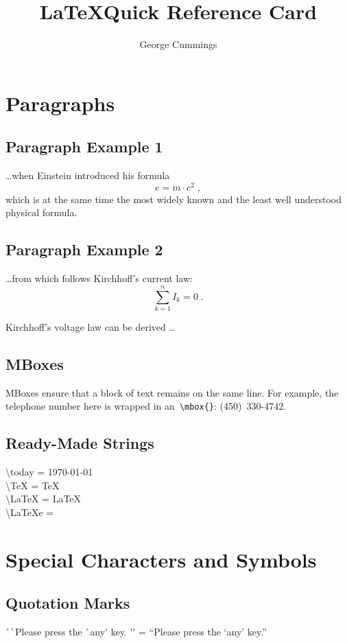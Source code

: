 \documentclass[letterpaper,12pt]{article}
\author{George Cummings}
\title{\LaTeX Quick Reference Card}
\begin{document}
\maketitle
\tableofcontents
\clearpage
{}
\section{Paragraphs}
\subsection{Paragraph Example 1}
\ldots when Einstein introduced his formula
\begin{equation}
	e = m \cdot c^2 \; ,
\end{equation}
which is at the same time the most widely known and the
least well understood physical formula. 
\subsection{Paragraph Example 2}
\ldots from which follows Kirchhoff's current law:
\begin{equation}
	\sum_{k=1}^{n} I_k = 0 \; .
\end{equation}

Kirchhoff's voltage law can be derived \ldots
\subsection{MBoxes}
MBoxes ensure that a block of text remains on the same line. For example,
the telephone number here is wrapped in an\verb| \mbox{}|: \mbox{(450) 330-4742}. 
\subsection{Ready-Made Strings}
\textbackslash today = \today \\
\textbackslash TeX = \TeX \\
\textbackslash LaTeX = \LaTeX \\
\textbackslash LaTeXe = \LaTeXe \\
\section{Special Characters and Symbols}
\subsection{Quotation Marks}
\`{}\`{}Please press the \`{}any\'{} key. \'{}\'{} = ``Please press the `any' key.''
\end{document}
